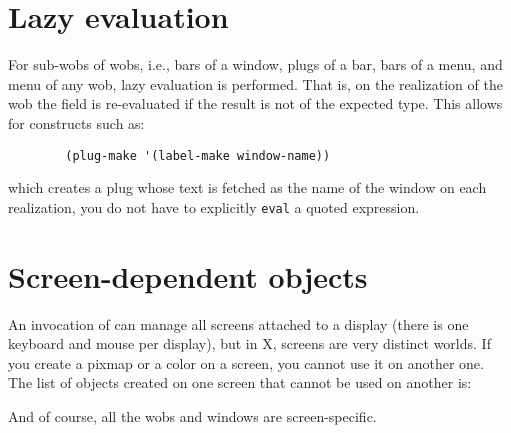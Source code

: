 \section{Lazy evaluation}

For sub-wobs of wobs, i.e., bars of a window, plugs of a bar, bars of a
menu, and menu of any wob, lazy evaluation is performed. That is, on the
realization of the wob the field is re-evaluated if the result is not
of the expected type. This allows for constructs such as:

{\exemplefont\begin{verbatim}
        (plug-make '(label-make window-name))
\end{verbatim}}

which creates a plug whose text is fetched as the name of the
window on each realization, you do not have to explicitly \verb"eval" a
quoted expression.

\section{Screen-dependent objects}

An invocation of {\GWM} can manage all screens attached to a display (there
is one keyboard and mouse per display), but in X, screens are very distinct
worlds. If you create a pixmap or a color on a screen, you cannot use it on
another one. The list of objects created on one screen that cannot be used
on another is:


And of course, all the wobs and windows are screen-specific.

